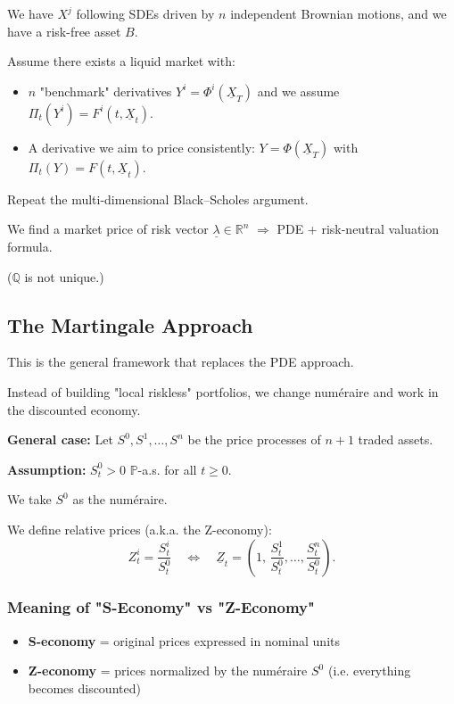 \documentclass[12pt,a4paper]{article}
\theoremstyle{definition}
\newcommand{\R}{\mathbb{R}}
\begin{document}
We have $X^j$ following SDEs driven by $n$ independent Brownian motions, and we have a risk-free asset $B$.

Assume there exists a liquid market with:
\begin{itemize}
\item $n$ "benchmark" derivatives $Y^i = \Phi^i(\underline{X}_T)$ and we assume $\Pi_t(Y^i) = F^i(t, \underline{X}_t)$.
\item A derivative we aim to price consistently: $Y = \Phi(\underline{X}_T)$ with $\Pi_t(Y) = F(t, \underline{X}_t)$.
\end{itemize}

Repeat the multi-dimensional Black--Scholes argument.

We find a market price of risk vector $\underline{\lambda} \in \R^n$ $\Rightarrow$ PDE + risk-neutral valuation formula.

($\mathbb{Q}$ is not unique.)

\subsection{The Martingale Approach}

This is the general framework that replaces the PDE approach.

Instead of building "local riskless" portfolios, we change numéraire and work in the discounted economy.

\textbf{General case:} Let $S^0, S^1, \ldots, S^n$ be the price processes of $n+1$ traded assets.

\textbf{Assumption:} $S_t^0 > 0$ $\mathbb{P}$-a.s. for all $t \geq 0$.

We take $S^0$ as the numéraire.

We define relative prices (a.k.a. the Z-economy):
\[
Z_t^i = \frac{S_t^i}{S_t^0} \quad \Longleftrightarrow \quad \underline{Z}_t = \left(1, \, \frac{S_t^1}{S_t^0}, \ldots, \frac{S_t^n}{S_t^0}\right).
\]

\subsubsection{Meaning of "S-Economy" vs "Z-Economy"}

\begin{itemize}
\item \textbf{S-economy} = original prices expressed in nominal units
\item \textbf{Z-economy} = prices normalized by the numéraire $S^0$ (i.e. everything becomes discounted)
\end{itemize}
\end{document}
